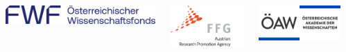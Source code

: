 \documentclass[final]{beamer}
\begin{document}
\begin{frame}[fragile]{}
\begin{columns}[T]
\begin{column}{.49\linewidth}
      \begin{block}{}
        \begin{columns}
          \begin{column}{0.3\columnwidth}
            \includegraphics[width=\columnwidth]{figures/logo-fwf.png}
          \end{column}
          \begin{column}{0.2\columnwidth}
            \includegraphics[width=\columnwidth]{figures/logo-ffg.png}
          \end{column}
          \begin{column}{0.4\columnwidth}
            \includegraphics[width=\columnwidth]{figures/logo-oeaw.png}
          \end{column}
          \begin{column}{0.07\columnwidth}

\end{column}
\end{columns}
\end{block}
\end{column}
\end{columns}
\end{frame}
\end{document}
